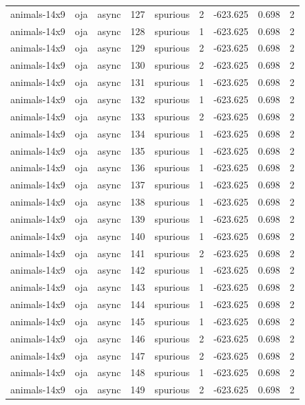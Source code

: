 \begin{tabular}{lllrlrrrr}
animals-14x9 & oja & async & 127 & spurious & 2 & -623.625 & 0.698 & 2 \\
animals-14x9 & oja & async & 128 & spurious & 1 & -623.625 & 0.698 & 2 \\
animals-14x9 & oja & async & 129 & spurious & 2 & -623.625 & 0.698 & 2 \\
animals-14x9 & oja & async & 130 & spurious & 2 & -623.625 & 0.698 & 2 \\
animals-14x9 & oja & async & 131 & spurious & 1 & -623.625 & 0.698 & 2 \\
animals-14x9 & oja & async & 132 & spurious & 1 & -623.625 & 0.698 & 2 \\
animals-14x9 & oja & async & 133 & spurious & 2 & -623.625 & 0.698 & 2 \\
animals-14x9 & oja & async & 134 & spurious & 1 & -623.625 & 0.698 & 2 \\
animals-14x9 & oja & async & 135 & spurious & 1 & -623.625 & 0.698 & 2 \\
animals-14x9 & oja & async & 136 & spurious & 1 & -623.625 & 0.698 & 2 \\
animals-14x9 & oja & async & 137 & spurious & 1 & -623.625 & 0.698 & 2 \\
animals-14x9 & oja & async & 138 & spurious & 1 & -623.625 & 0.698 & 2 \\
animals-14x9 & oja & async & 139 & spurious & 1 & -623.625 & 0.698 & 2 \\
animals-14x9 & oja & async & 140 & spurious & 1 & -623.625 & 0.698 & 2 \\
animals-14x9 & oja & async & 141 & spurious & 2 & -623.625 & 0.698 & 2 \\
animals-14x9 & oja & async & 142 & spurious & 1 & -623.625 & 0.698 & 2 \\
animals-14x9 & oja & async & 143 & spurious & 1 & -623.625 & 0.698 & 2 \\
animals-14x9 & oja & async & 144 & spurious & 1 & -623.625 & 0.698 & 2 \\
animals-14x9 & oja & async & 145 & spurious & 1 & -623.625 & 0.698 & 2 \\
animals-14x9 & oja & async & 146 & spurious & 2 & -623.625 & 0.698 & 2 \\
animals-14x9 & oja & async & 147 & spurious & 2 & -623.625 & 0.698 & 2 \\
animals-14x9 & oja & async & 148 & spurious & 1 & -623.625 & 0.698 & 2 \\
animals-14x9 & oja & async & 149 & spurious & 2 & -623.625 & 0.698 & 2 \\

\end{tabular}
